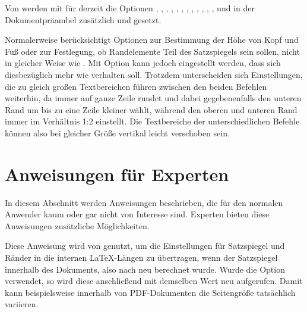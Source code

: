 {\setlength{\emergencystretch}{1em}%
Von  werden mit  für 
derzeit die Optionen
, , ,
, , ,
, , ,
, , , 
und in der Dokumentpräambel zusätzlich  und
 gesetzt.\par}%
\EndIndexGroup


\begin{Declaration}
\end{Declaration}
Normalerweise berücksichtigt  Optionen zur
Bestimmung der Höhe von Kopf und Fuß oder zur Festlegung, ob Randelemente Teil
des Satzspiegels sein sollen, nicht in gleicher Weise wie
. Mit Option
 kann jedoch
eingestellt werden, dass sich  diesbezüglich
mehr wie  verhalten soll. Trotzdem
unterscheiden sich Einstellungen, die zu gleich großen Textbereichen führen
zwischen den beiden Befehlen weiterhin, da 
immer auf ganze Zeile rundet und dabei gegebenenfalls den unteren Rand um bis
zu eine Zeile kleiner wählt, während  den oberen
und unteren Rand immer im Verhältnis 1:2 einstellt. Die Textbereiche der
unterschiedlichen Befehle können also bei gleicher Größe vertikal leicht
verschoben sein.%
\EndIndexGroup


\section{Anweisungen für Experten}

In diesem Abschnitt werden Anweisungen beschrieben, die für den normalen
Anwender kaum oder gar nicht von Interesse sind. Experten bieten diese
Anweisungen zusätzliche Möglichkeiten.

\begin{Declaration}
\end{Declaration}%
Diese Anweisung wird von  genutzt, um die Einstellungen für
Satzspiegel und Ränder in die internen \LaTeX-Längen zu übertragen, wenn der
Satzspiegel innerhalb des Dokuments, also nach
 neu berechnet wurde. Wurde die Option
 verwendet, so wird diese anschließend mit
demselben Wert neu aufgerufen. Damit kann beispielsweise innerhalb von
PDF-Dokumenten die Seitengröße tatsächlich variieren.

